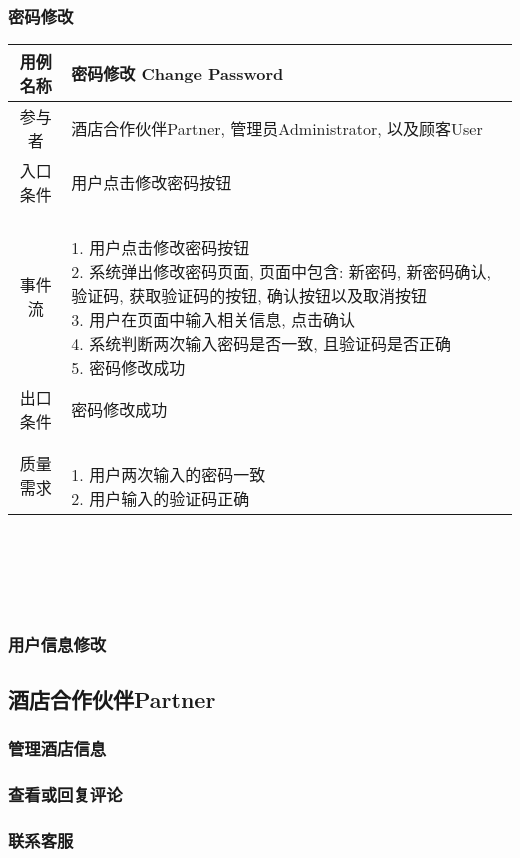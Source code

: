 \documentclass[11pt]{article}
\begin{document}
		\subsubsection{密码修改}
			\begin{tabular}{c|l}
			\hline
			用例名称 & 密码修改 Change Password \\ \hline
			参与者 & 酒店合作伙伴Partner, 管理员Administrator, 以及顾客User  \\ \hline
			入口条件 & 用户点击修改密码按钮 \\ \hline
			事件流 & 	\parbox{33em}{\ \\
						1. 用户点击修改密码按钮 \\
						2. 系统弹出修改密码页面, 页面中包含: 新密码, 新密码确认, 验证码, 获取验证码的按钮, 确认按钮以及取消按钮\\
						3. 用户在页面中输入相关信息, 点击确认  \\
						4. 系统判断两次输入密码是否一致, 且验证码是否正确 \\
						5. 密码修改成功 \\
						} \\ \hline
			出口条件 & 密码修改成功 \\ \hline
			质量需求 & \parbox{33em}{\ \\
						1. 用户两次输入的密码一致 \\
						2. 用户输入的验证码正确 \\
						} \\ \hline
			\end{tabular}\\ \\ \\ \\ 

		\subsubsection{用户信息修改}

	\subsection{酒店合作伙伴Partner}
		\subsubsection{管理酒店信息}
		\subsubsection{查看或回复评论}
		\subsubsection{联系客服}
\end{document}
